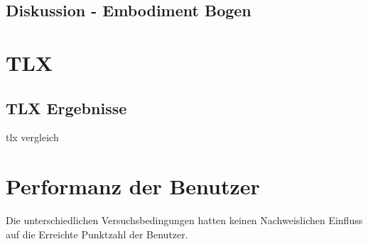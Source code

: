 \subsection{Diskussion - Embodiment Bogen}


\section{TLX}


\subsection{TLX Ergebnisse}
\cite{Abtahi2019}
tlx vergleich

\section{Performanz der Benutzer}
Die unterschiedlichen Versuchsbedingungen hatten keinen Nachweislichen Einfluss auf die Erreichte Punktzahl der Benutzer.
















